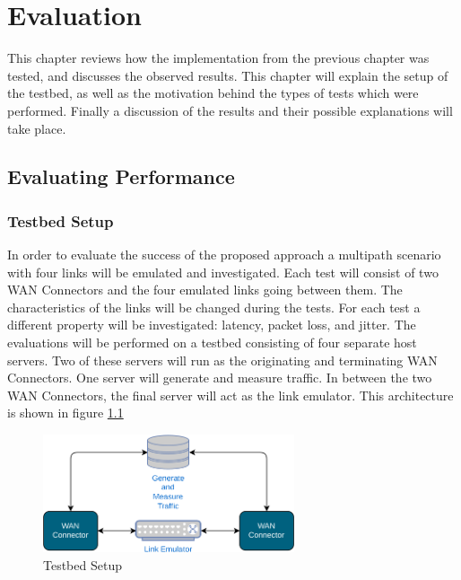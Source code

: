 
\cleardoublepage
\chapter{Evaluation}
\label{cha:evaluation}

This chapter reviews how the implementation from the previous chapter was tested, and discusses the observed results. This chapter will explain the setup of the testbed, as well as the motivation behind the types of tests which were performed. Finally a discussion of the results and their possible explanations will take place.


\section{Evaluating Performance}

\subsection{Testbed Setup}

In order to evaluate the success of the proposed approach a multipath scenario with four links will be emulated and investigated. Each test will consist of two WAN Connectors and the four emulated links going between them. The characteristics of the links will be changed during the tests. For each test a different property will be investigated: latency, packet loss, and jitter. The evaluations will be performed on a testbed consisting of four separate host servers. Two of these servers will run as the originating and terminating WAN Connectors. One server will generate and measure traffic. In between the two WAN Connectors, the final server will act as the link emulator. This architecture is shown in figure \ref{fig:testbed}

\begin{figure}[h]
    \centering
        \includegraphics[width=0.66\textwidth]{fig/testbed.png}
        \caption{Testbed Setup}
        \label{fig:testbed}
\end{figure}

